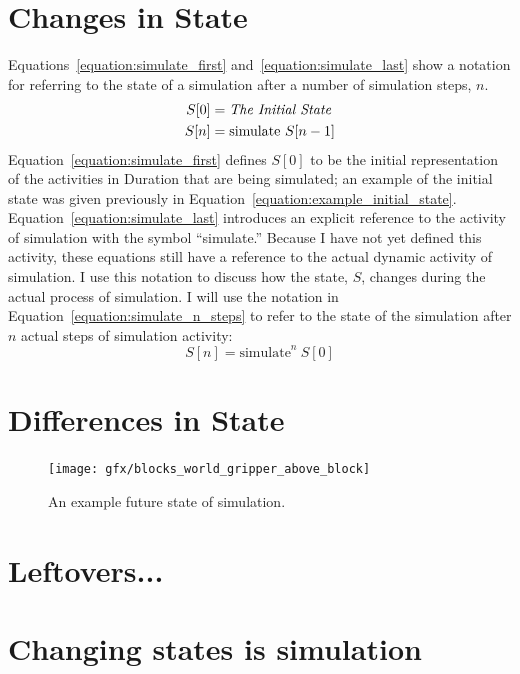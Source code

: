 \section{Changes in State}

Equations~\ref{equation:simulate_first}
and~\ref{equation:simulate_last} show a notation for referring to the
state of a simulation after a number of simulation steps, $n$.
\begin{align}
\label{equation:simulate_first}
S[0] &= \text{\emph{The Initial State}} \\
\label{equation:simulate_last}
S[n] &= \text{simulate}~S[n-1]
\end{align}
Equation~\ref{equation:simulate_first} defines $S[0]$ to be the
initial representation of the activities in Duration that are being
simulated; an example of the initial state was given previously in
Equation~\ref{equation:example_initial_state}.
Equation~\ref{equation:simulate_last} introduces an explicit reference
to the activity of simulation with the symbol ``simulate.''  Because I
have not yet defined this activity, these equations still have a
reference to the actual dynamic activity of simulation.  I use this
notation to discuss how the state, $S$, changes during the actual
process of simulation.  I will use the notation in
Equation~\ref{equation:simulate_n_steps} to refer to the state of the
simulation after $n$ actual steps of simulation activity:
\begin{equation}
\label{equation:simulate_n_steps}
S[n] = \text{simulate}^n~S[0]
\end{equation}

\section{Differences in State}

\begin{figure}[bth]
\texttt{[image: gfx/blocks\_world\_gripper\_above\_block]}
\caption{An example future state of simulation.}
\label{figure:blocks_world_gripper_above_block}
\end{figure}



\section{Leftovers...}

\section{Changing states is simulation}

